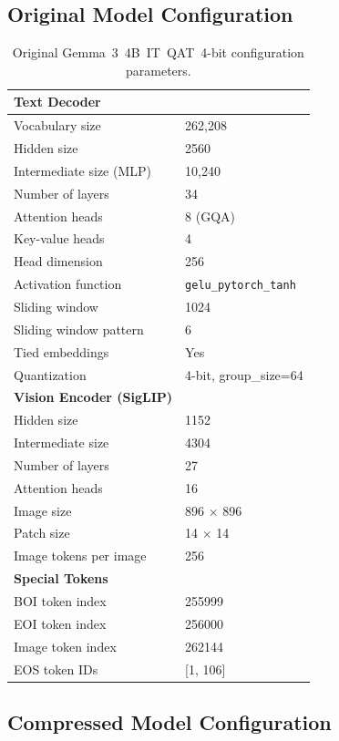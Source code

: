 \documentclass[11pt]{article}
\begin{document}
\subsection{Original Model Configuration}

\begin{table}[h]
\centering
\caption{Original Gemma~3~4B~IT~QAT~4-bit configuration parameters.}
\label{tab:orig_config}
\begin{tabular}{@{}ll@{}}
\toprule
\textbf{Text Decoder} & \\
\midrule
Vocabulary size & 262,208 \\
Hidden size & 2560 \\
Intermediate size (MLP) & 10,240 \\
Number of layers & 34 \\
Attention heads & 8 (GQA) \\
Key-value heads & 4 \\
Head dimension & 256 \\
Activation function & \texttt{gelu\_pytorch\_tanh} \\
Sliding window & 1024 \\
Sliding window pattern & 6 \\
Tied embeddings & Yes \\
Quantization & 4-bit, group\_size=64 \\
\midrule
\textbf{Vision Encoder (SigLIP)} & \\
\midrule
Hidden size & 1152 \\
Intermediate size & 4304 \\
Number of layers & 27 \\
Attention heads & 16 \\
Image size & 896 $\times$ 896 \\
Patch size & 14 $\times$ 14 \\
Image tokens per image & 256 \\
\midrule
\textbf{Special Tokens} & \\
\midrule
BOI token index & 255999 \\
EOI token index & 256000 \\
Image token index & 262144 \\
EOS token IDs & [1, 106] \\
\bottomrule
\end{tabular}
\end{table}

\subsection{Compressed Model Configuration}
\end{document}
